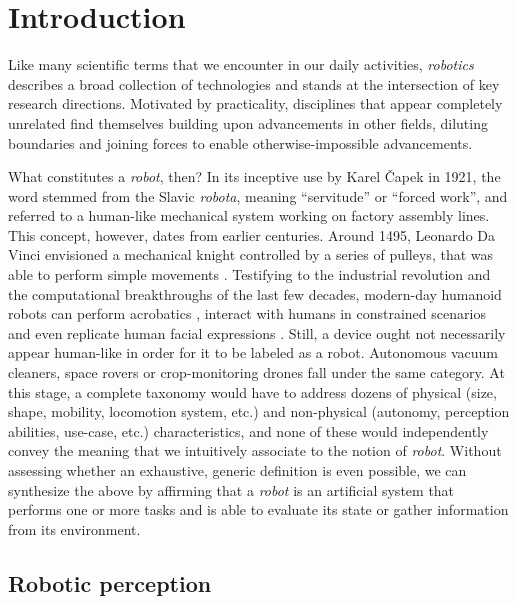 \chapter{Introduction}
\label{ch:intro}


Like many scientific terms that we encounter in our daily activities, \emph{robotics} describes a broad collection of technologies and stands at the intersection of key research directions. Motivated by practicality, disciplines that appear completely unrelated find themselves building upon advancements in other fields, diluting boundaries and joining forces to enable otherwise-impossible advancements.

What constitutes a \emph{robot}, then? In its inceptive use by Karel Čapek \cite{roberts_robotics_history_1999} in 1921, the word stemmed from the Slavic \emph{robota}, meaning ``servitude'' or ``forced work'', and referred to a human-like mechanical system working on factory assembly lines. This concept, however, dates from earlier centuries. Around 1495, Leonardo Da Vinci envisioned a mechanical knight controlled by a series of pulleys, that was able to perform simple movements \cite{taddei_leonardo_robots_2008}. Testifying to the industrial revolution and the computational breakthroughs of the last few decades, modern-day humanoid robots can perform acrobatics \cite{bostondynamics_backflips_2023}, interact with humans in constrained scenarios \cite{humanoids_hospital,humanoid_school,humanoid_school2} and even replicate human facial expressions \cite{humanoid_facial}. Still, a device ought not necessarily appear human-like in order for it to be labeled as a robot. Autonomous vacuum cleaners, space rovers or crop-monitoring drones fall under the same category. At this stage, a complete taxonomy would have to address dozens of physical (size, shape, mobility, locomotion system, etc.) and non-physical (autonomy, perception abilities, use-case, etc.) characteristics, and none of these would independently convey the meaning that we intuitively associate to the notion of \emph{robot}. Without assessing whether an exhaustive, generic definition is even possible, we can synthesize the above by affirming that a \emph{robot} is an artificial system that performs one or more tasks and is able to evaluate its state or gather information from its environment.

\section{Robotic perception}

